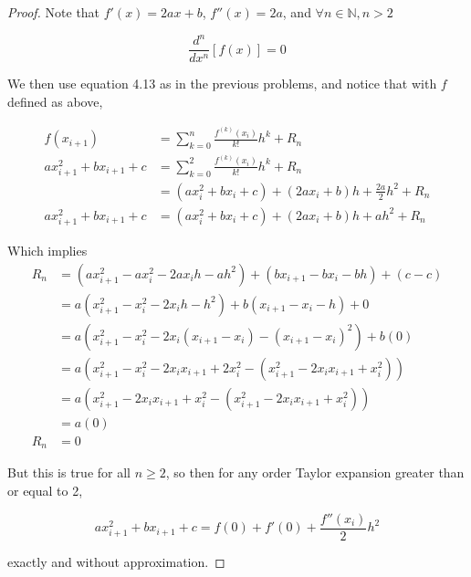 \documentclass{article}
\begin{document}
\begin{proof}
Note that $f'(x) = 2ax+b$, $f''(x) = 2a$, and $\forall n\in\mathbb{N}, n>2$

\[ \frac{d^{n}}{dx^{n}}\left[ f(x) \right] = 0 \]

We then use equation 4.13 as in the previous problems, and notice that with $f$ defined as above, 

\begin{align*}
f(x_{i+1}) &= \sum_{k=0}^{n} \frac{f^{(k)}(x_{i})}{k!} h^{k} + R_{n}\\
ax_{i+1}^{2} + bx_{i+1} + c &= \sum_{k=0}^{2} \frac{f^{(k)}(x_{i})}{k!} h^{k} + R_{n}\\
							&= (ax_{i}^{2} + bx_{i} + c) + (2ax_{i} + b)h + \frac{2a}{2}h^{2} + R_{n}\\
ax_{i+1}^{2} + bx_{i+1} + c	&= (ax_{i}^{2} + bx_{i} + c) + (2ax_{i} + b)h + ah^{2} + R_{n}
\end{align*}

Which implies
\begin{align*}
R_{n} 	&= (ax_{i+1}^{2} - ax_{i}^{2} - 2ax_{i}h - ah^{2}) + (bx_{i+1} - bx_{i} - bh) + (c - c)\\
		&= a(x_{i+1}^{2} - x_{i}^{2} - 2x_{i}h - h^{2}) + b(x_{i+1} - x_{i} - h) + 0\\
		&= a(x_{i+1}^{2} - x_{i}^{2} - 2x_{i}(x_{i+1} - x_{i}) - (x_{i+1} - x_{i})^{2}) + b(0)\\
		&= a(x_{i+1}^{2} - x_{i}^{2} - 2x_{i}x_{i+1} + 2x_{i}^{2} - (x_{i+1}^{2} - 2x_{i}x_{i+1} + x_{i}^{2}))\\
		&= a(x_{i+1}^{2} - 2x_{i}x_{i+1} + x_{i}^{2} - (x_{i+1}^{2} - 2x_{i}x_{i+1} + x_{i}^{2}))\\
		&= a(0)\\
R_{n}	&= 0
\end{align*}

But this is true for all $n\geq 2$, so then for any order Taylor expansion greater than or equal to 2,

\[ ax_{i+1}^{2} + bx_{i+1} + c = f(0) + f'(0) + \frac{f''(x_{i})}{2}h^{2} \]

exactly and without approximation.

\end{proof}
\end{document}
